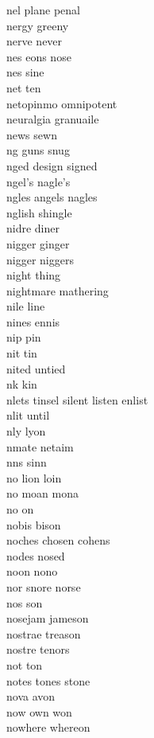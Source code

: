 nel plane penal  \\
nergy greeny \\
nerve never\\
nes eons nose \\
nes sine \\
net ten\\
netopinmo omnipotent \\
neuralgia granuaile\\
news sewn\\
ng guns snug  \\
nged design signed  \\
ngel's nagle's \\
ngles angels nagles \\
nglish shingle \\
nidre diner\\
nigger ginger\\
nigger niggers \\
night thing\\
nightmare mathering\\
nile line\\
nines ennis\\
nip pin\\
nit tin\\
nited untied \\
nk kin \\
nlets tinsel silent listen enlist \\
nlit until \\
nly lyon \\
nmate netaim \\
nns sinn \\
no lion loin  \\
no moan mona  \\
no on\\
nobis bison\\
noches chosen cohens\\
nodes nosed\\
noon nono\\
nor snore norse  \\
nos son\\
nosejam jameson\\
nostrae treason\\
nostre tenors\\
not ton\\
notes tones stone\\
nova avon\\
now own won\\
nowhere whereon\\
